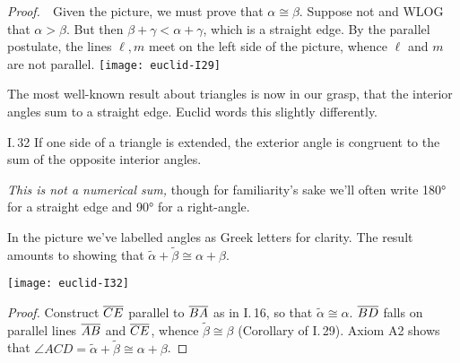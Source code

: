 \begin{tcolorbox}[proofstyle,lower separated=false, sidebyside, sidebyside align=top seam, sidebyside gap=0pt, righthand width=0.37\linewidth]
	\emph{Proof.}\ \ Given the picture, we must prove that $\alpha\cong\beta$.\smallbreak
	Suppose not and WLOG that $\alpha>\beta$.\smallbreak
	But then $\beta+\gamma<\alpha+\gamma$, which is a straight edge.\smallbreak
	By the parallel postulate, the lines $\ell,m$ meet on the left side of the picture, whence $\ell$ and $m$ are not parallel.
	\tcblower
	\flushright
	\texttt{[image: euclid-I29]}\\[-10pt]\qedsymbol
\end{tcolorbox}

The most well-known result about triangles is now in our grasp, that the interior angles sum to a straight edge. Euclid words this slightly differently.

\begin{thm}{I.\,32}{}
	If one side of a triangle is extended, the exterior angle is congruent to the sum of the opposite interior angles.
\end{thm}

\begin{minipage}[t]{0.62\linewidth}\vspace{-4pt}
	\emph{This is not a numerical sum,} though for familiarity's sake we'll often write \ang{180} for a straight edge and \ang{90} for a right-angle.\par
	In the picture we've labelled angles as Greek letters for clarity. The result amounts to showing that $\widetilde\alpha+\widetilde\beta\cong\alpha+\beta$.
\end{minipage}
\hfill
\begin{minipage}[t]{0.37\linewidth}\vspace{-9pt}
	\flushright
	\texttt{[image: euclid-I32]}
\end{minipage}

\vspace{-20pt}

\begin{proof}
	Construct $\overline{CE}$ parallel to $\overline{BA}$ as in I.\,16, so that $\widetilde\alpha\cong\alpha$.\smallbreak
	$\overline{BD}$ falls on parallel lines $\overline{AB}$ and $\overline{CE}$, whence $\widetilde\beta\cong\beta$ (Corollary of I.\,29).\smallbreak
	Axiom A2 shows that $\angle ACD=\widetilde\alpha+\widetilde\beta\cong\alpha+\beta$.
\end{proof}


\medskip


